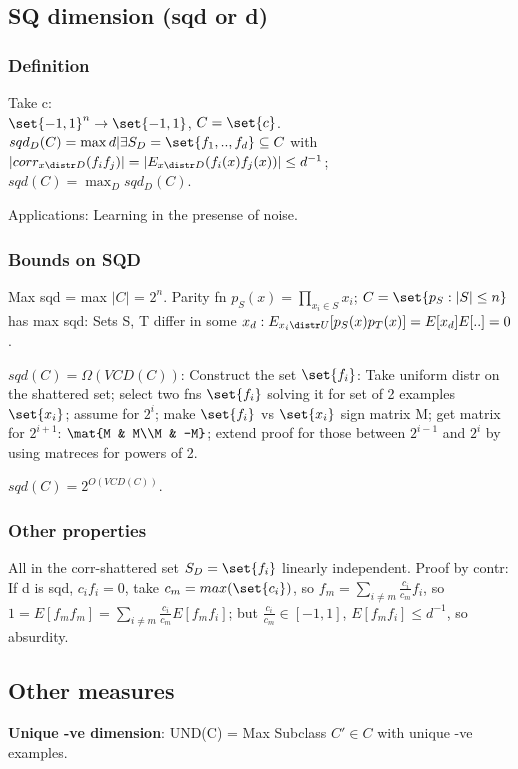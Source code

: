 \documentclass[oneside, article]{memoir}
\begin{document}
\subsection{SQ dimension (sqd or d)}
\subsubsection{Definition}
Take c: \\
$\set{-1, 1}^{n} \to \set{-1, 1}$, $C = \set{c}$. $sqd_{D}(C) = \max d | \exists S_{D} = \set{f_{1}, .., f_{d}} \subseteq C$ with $|corr_{x \distr D}(f_{i}f_{j})| = |E_{x \distr D}(f_{i}(x)f_{j}(x))| \leq d^{-1}$; \\
$sqd(C) = \max_{D} sqd_{D}(C)$.

Applications: Learning in the presense of noise.

\subsubsection{Bounds on SQD}
Max sqd  = max $|C|$ = $2^{n}$. Parity fn $p_{S}(x) = \prod_{x_{i} \in S} x_{i}$; $C = \set{p_{S}: |S|\leq n}$ has max sqd: Sets S, T differ in some $x_{d}: E_{x_{i} \distr U}[p_{S}(x)p_{T}(x)] = E[x_{d}]E[..] = 0$.

$sqd(C) = \Omega(VCD(C))$: Construct the set $\set{f_{i}}$: Take uniform distr on the shattered set; select two fns $\set{f_{i}}$ solving it for set of 2 examples $\set{x_i}$; assume for $2^{i}$; make $\set{f_{i}}$ vs $\set{x_i}$ sign matrix M; get matrix for $2^{i+1}$: $\mat{M & M\\M & -M}$; extend proof for those between $2^{i-1}$ and $2^{i}$ by using matreces for powers of 2.

$sqd(C) = 2^{O(VCD(C))}$. \why

\subsubsection{Other properties}
All in the corr-shattered set $S_{D} = \set{f_{i}}$ linearly independent. Proof by contr: If d is sqd, $c_{i}f_{i} = 0$, take $c_{m} = max(\set{c_{i}})$, so $f_{m} = \sum_{i \neq m} \frac{c_{i}}{c_{m}}f_{i}$, so $1 = E[f_{m}f_{m}] = \sum_{i \neq m} \frac{c_{i}}{c_{m}} E[f_{m}f_{i}]$; but $\frac{c_{i}}{c_{m}} \in [-1, 1]$, $E[f_{m}f_{i}] \leq d^{-1}$, so absurdity.

\subsection{Other measures}
\textbf{Unique -ve dimension}: UND(C) = Max Subclass $C' \in C$ with unique -ve examples.
\end{document}
